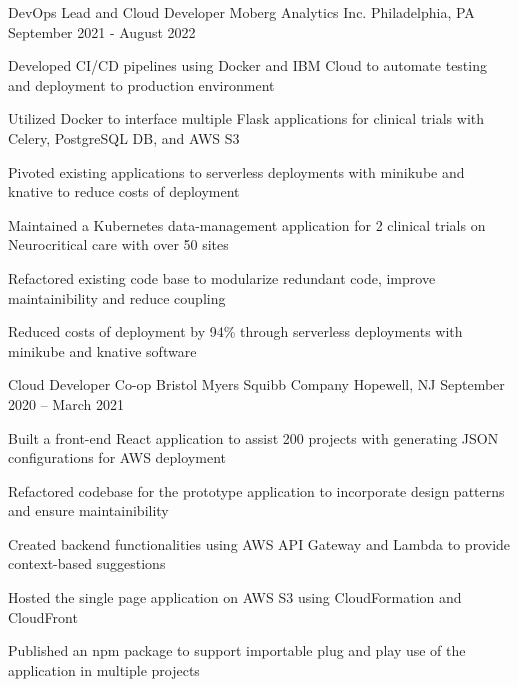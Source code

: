 \begin{cventries}
	\cventry
	{DevOps Lead and Cloud Developer}
	{Moberg Analytics Inc.}
	{Philadelphia, PA}
	{September 2021 - August 2022}
	{\begin{cvitems}
		\item {Developed CI/CD pipelines using Docker and IBM Cloud to automate testing and deployment to production environment}
		\item {Utilized Docker to interface multiple Flask applications for clinical trials with Celery, PostgreSQL DB, and AWS S3}
		\item {Pivoted existing applications to serverless deployments with minikube and knative to reduce costs of deployment}
		\item {Maintained a Kubernetes data-management application for 2 clinical trials on Neurocritical care with over 50 sites}
		\item {Refactored existing code base to modularize redundant code, improve maintainibility and reduce coupling}
		\item {Reduced costs of deployment by 94\% through serverless deployments with minikube and knative software}
		\end{cvitems}}
	

	\cventry
	{Cloud Developer Co-op}
	{Bristol Myers Squibb Company}
	{Hopewell, NJ}
	{September 2020 – March 2021}
	{\begin{cvitems}
        \item {Built a front-end React application to assist 200 projects with generating JSON configurations for AWS deployment}
        \item {Refactored codebase for the prototype application to incorporate design patterns and ensure maintainibility}
        \item {Created backend functionalities using AWS API Gateway and Lambda to provide context-based suggestions}
        \item {Hosted the single page application on AWS S3 using CloudFormation and CloudFront}
        \item {Published an npm package to support importable plug and play use of the application in multiple projects}
		\end{cvitems}}
	

\end{cventries}
